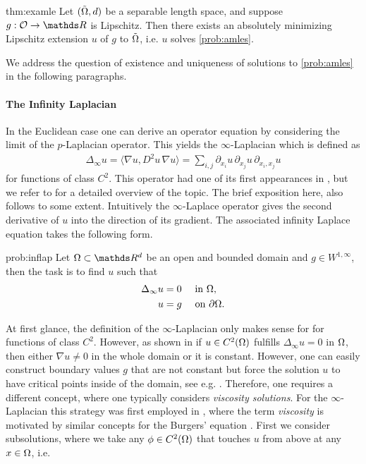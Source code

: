 \begin{theorem}{\cite[Th. 4.3]{juutinen2002absolutely}}{thm:examle}
Let $(\tilde{\Omega}, d)$ be a separable length space, and suppose $g: \conset\to\R$ is Lipschitz. Then there exists an absolutely minimizing Lipschitz extension $u$ of $g$ to $\tilde{\Omega}$, i.e. $u$ solves \cref{prob:amles}.
\end{theorem}
%
\noindent%
We address the question of existence and uniqueness of solutions to \cref{prob:amles} in the following paragraphs.
%
%
\paragraph{The Infinity Laplacian} In the Euclidean case one can derive an operator equation by considering the limit of the $p$-Laplacian operator. This yields the $\infty$-Laplacian which is defined as
%
\begin{align*}
\Delta_\infty u = \langle \nabla u, D^2 u\, \nabla u\rangle = 
\sum_{i,j} \partial_{x_i} u\, \partial_{x_j} u\, \partial_{x_i,x_j} u
\end{align*}
%
for functions of class $C^2$. This operator had one of its first appearances in \cite{aronsson1968partial}, but we refer to \cite{lindqvist2017notes} for a detailed overview of the topic. The brief exposition here, also follows \cite{lindqvist2017notes} to some extent. Intuitively the $\infty$-Laplace operator gives the second derivative of $u$ into the direction of its gradient. The associated infinity Laplace equation takes the following form.
%
\begin{problem}{}{prob:inflap}
Let $\domain\subset\R^d$ be an open and bounded domain and $g\in W^{1,\infty}$, then the task is to find $u$ such that
%
\begin{align*}
\Delta_\infty u &= 0\quad\text{ in }\Omega,\\
u &= g\quad \text{ on }\partial\Omega.
\end{align*}
\end{problem}
%
\noindent%
At first glance, the definition of the $\infty$-Laplacian only makes sense for for functions of class $C^2$. However, as shown in \cite{yu2006remark, aronsson1968partial} if $u\in C^2(\Omega)$ fulfills $\Delta_\infty u = 0$ in $\Omega$, then either $\nabla u \neq 0$ in the whole domain or it is constant. However, one can easily construct boundary values $g$ that are not constant but force the solution $u$ to have critical points inside of the domain, see e.g. \cite{lindqvist2016notes}. Therefore, one requires a different concept, where one typically considers \emph{viscosity solutions}. For the $\infty$-Laplacian this strategy was first employed in \cite{bhattacharya1989limits}, where the term \emph{viscosity} is motivated by similar concepts for the Burgers' equation \cite{burgers1948mathematical}. First we consider subsolutions, where we take any $\phi\in C^2(\Omega)$ that touches $u$ from above at any $x\in\Omega$, i.e.
